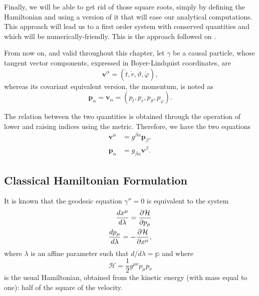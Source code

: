 Finally, we will be able to get rid of those square roots, simply by defining the Hamiltonian and using a version of it that will ease our analytical computations. This approach will lead us to a first order system with conserved quantities and which will be numerically-friendly. This is the approach followed on \cite{thorne15}.

From now on, and valid throughout this chapter, let $\gamma$ be a causal particle, whose tangent vector components, expressed in Boyer-Lindquist coordinates, are
\begin{equation}
\label{eq:blcoord1}
\mathbf{v}^\alpha = (\dot{t}, \dot{r}, \dot{\vartheta}, \dot{\varphi}),
\end{equation}
whereas its covariant equivalent version, the momentum, is noted as
\begin{equation}
\label{eq:blcoord2}
\mathbf{p}_\alpha = \mathbf{v}_\alpha = (p_t, p_r, p_\vartheta, p_\varphi).
\end{equation}

The relation between the two quantities is obtained through the operation of lower and raising indices using the metric. Therefore, we have the two equations
\begin{align}
\label{eq:raisep}
\mathbf{v}^\alpha &= g^{\beta\alpha} \mathbf{p}_\beta, \\
\label{eq:lowerv}
\mathbf{p}_\alpha &= g_{\beta\alpha} \mathbf{v}^\beta.
\end{align}

\subsection{Classical Hamiltonian Formulation}

It is known \cite[Sec. 33.5]{thorne73} that the geodesic equation $\gamma'' = 0$ is equivalent to the system
\begin{align*}
\frac{dx^\mu}{d\lambda} = \frac{\partial^{} \mathcal{H}}{\partial p_\mu} \\
\frac{dp_\mu}{d\lambda} = - \frac{\partial^{} \mathcal{H}}{\partial x^\mu},
\end{align*}
where $\lambda$ is an affine parameter such that $d/d\lambda = \mathbb{p}$ and where
\[
\mathcal{H} = \frac{1}{2} g^{\mu\nu} p_\mu p_\nu
\]
is the usual Hamiltonian, obtained from the kinetic energy (with mass equal to one): half of the square of the velocity.

